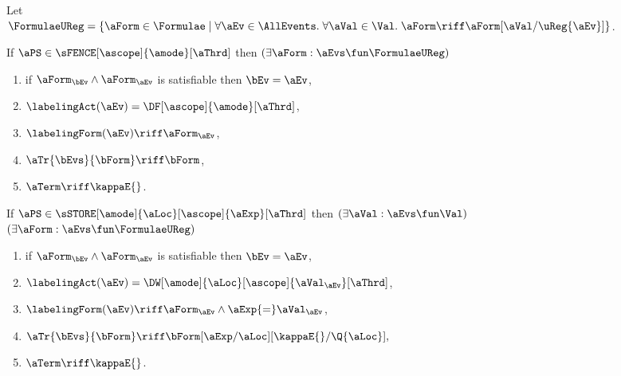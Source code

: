 \begin{figure}
  \noindent
  Let $\FormulaeUReg=\{\aForm\in\Formulae\mid \forall\aEv\in\AllEvents.\;\forall\aVal\in\Val.\;\aForm\riff \aForm[\aVal/\uReg{\aEv}]\}$.
  \medskip

  \noindent
  If $\aPS \in \sFENCE[\ascope]{\amode}[\aThrd]$ then
  $(\exists\aForm:\aEvs\fun\FormulaeUReg)$
  \begin{multicols}{2}
    \begin{enumerate}[topsep=0pt,label=(\textsc{f}\arabic*),ref=\textsc{f}\arabic*]
    \item \label{fence-E}
      if $\aForm_\bEv\land\aForm_\aEv$ is satisfiable then $\bEv=\aEv$,
    \item \label{fence-lambda}
      $\labelingAct(\aEv) = \DF[\ascope]{\amode}[\aThrd]$,
    \item \label{fence-kappa}
      \begin{math}
        \labelingForm(\aEv) \riff
        \aForm_\aEv
      \end{math},    
    \item \label{fence-tau}
      $\aTr{\bEvs}{\bForm} \riff \bForm$,
    \item \label{fence-term}
      $\aTerm \riff \kappaE{}$.
    \end{enumerate}
  \end{multicols}
  \medskip

  \noindent
  If $\aPS \in \sSTORE[\amode]{\aLoc}[\ascope]{\aExp}[\aThrd]$ then
  $(\exists\aVal:\aEvs\fun\Val)$
  $(\exists\aForm:\aEvs\fun\FormulaeUReg)$
  \begin{multicols}{2}
    \begin{enumerate}[topsep=0pt,label=(\textsc{w}\arabic*),ref=\textsc{w}\arabic*]
    \item \label{write-E-ca}
      if $\aForm_\bEv\land\aForm_\aEv$ is satisfiable then $\bEv=\aEv$,
    \item \label{write-lambda-ca}
      $\labelingAct(\aEv) = \DW[\amode]{\aLoc}[\ascope]{\aVal_\aEv}[\aThrd]$,
    \item \label{write-kappa-ca}
      \begin{math}
        \labelingForm(\aEv) \riff
        \aForm_\aEv
        \land
        \aExp{=}\aVal_\aEv
      \end{math},    
    \item \label{write-tau-ca}
      \begin{math}
        \aTr{\bEvs}{\bForm} \riff
        \bForm
        [\aExp/\aLoc][{\kappaE{}}/\Q{\aLoc}], 
      \end{math}
    \item \label{write-term-ca}
      $\aTerm \riff \kappaE{}$.
    \end{enumerate}  
  \end{multicols}
  \medskip


\end{figure}
